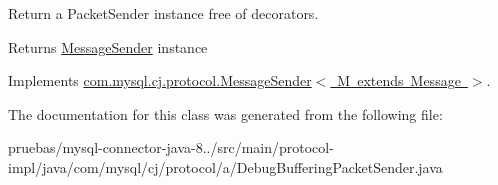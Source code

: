 Return a Packet\+Sender instance free of decorators.

\begin{DoxyReturn}{Returns}
\mbox{\hyperlink{interfacecom_1_1mysql_1_1cj_1_1protocol_1_1_message_sender}{Message\+Sender}} instance 
\end{DoxyReturn}


Implements \mbox{\hyperlink{interfacecom_1_1mysql_1_1cj_1_1protocol_1_1_message_sender_a8066931f03c2fa9cc705716fa10a4517}{com.\+mysql.\+cj.\+protocol.\+Message\+Sender$<$ M extends Message $>$}}.



The documentation for this class was generated from the following file\+:\begin{DoxyCompactItemize}
\item 
pruebas/mysql-\/connector-\/java-\/8../src/main/protocol-\/impl/java/com/mysql/cj/protocol/a/Debug\+Buffering\+Packet\+Sender.\+java\end{DoxyCompactItemize}
